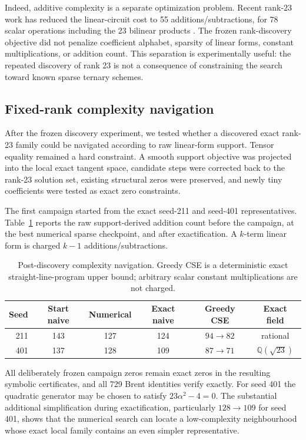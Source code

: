 \documentclass[11pt]{article}
\newcommand{\QQ}{\mathbb{Q}}
\begin{document}
Indeed, additive complexity is a separate optimization problem.  Recent rank-23 work has reduced the linear-circuit cost to 55 additions/subtractions, for 78 scalar operations including the 23 bilinear products \cite{karunaratne2026}.  The frozen rank-discovery objective did not penalize coefficient alphabet, sparsity of linear forms, constant multiplications, or addition count.  This separation is experimentally useful: the repeated discovery of rank 23 is not a consequence of constraining the search toward known sparse ternary schemes.

\subsection{Fixed-rank complexity navigation}

After the frozen discovery experiment, we tested whether a discovered exact rank-23 family could be navigated according to raw linear-form support.  Tensor equality remained a hard constraint.  A smooth support objective was projected into the local exact tangent space, candidate steps were corrected back to the rank-23 solution set, existing structural zeros were preserved, and newly tiny coefficients were tested as exact zero constraints.

The first campaign started from the exact seed-211 and seed-401 representatives.  Table~\ref{tab:complexity} reports the raw support-derived addition count before the campaign, at the best numerical sparse checkpoint, and after exactification.  A $k$-term linear form is charged $k-1$ additions/subtractions.

\begin{table}[ht]
\centering
\caption{Post-discovery complexity navigation.  Greedy CSE is a deterministic exact straight-line-program upper bound; arbitrary scalar constant multiplications are not charged.}
\label{tab:complexity}
\begin{tabular}{rccccc}
\toprule
Seed & Start naive & Numerical & Exact naive & Greedy CSE & Exact field \\
\midrule
211 & 143 & 127 & 124 & $94\to82$ & rational \\
401 & 137 & 128 & 109 & $87\to71$ & $\QQ(\sqrt{23})$ \\
\bottomrule
\end{tabular}
\end{table}

All deliberately frozen campaign zeros remain exact zeros in the resulting symbolic certificates, and all 729 Brent identities verify exactly.  For seed 401 the quadratic generator may be chosen to satisfy $23\alpha^2-4=0$.  The substantial additional simplification during exactification, particularly $128\to109$ for seed 401, shows that the numerical search can locate a low-complexity neighbourhood whose exact local family contains an even simpler representative.
\end{document}

